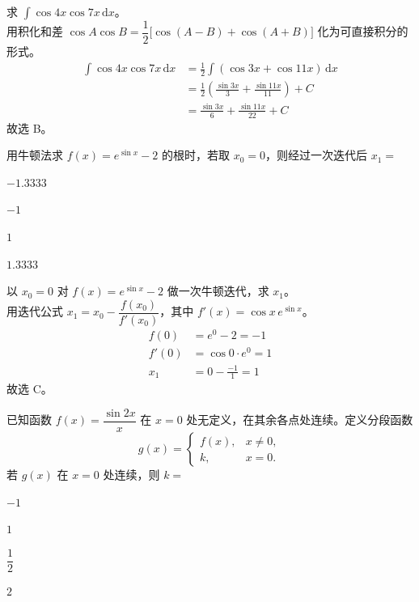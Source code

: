 \begin{solution}
    求 $\displaystyle\int\cos 4x\cos 7x\,\mathrm{d}x$。\\
    用积化和差 $\cos A\cos B=\dfrac12\bigl[\cos(A-B)+\cos(A+B)\bigr]$ 化为可直接积分的形式。\\
    \begin{align*}
        \int\cos 4x\cos 7x\,\mathrm{d}x
        &=\frac12\int(\cos3x+\cos11x)\,\mathrm{d}x \\
        &=\frac12\left(\frac{\sin3x}{3}+\frac{\sin11x}{11}\right)+C \\
        &=\frac{\sin3x}{6}+\frac{\sin11x}{22}+C
    \end{align*}
    故选 B。
\end{solution}

\begin{question}
    用牛顿法求 $f(x)=e^{\sin x}-2$ 的根时，若取 $x_0=0$，则经过一次迭代后 $x_1=$ \paren[C]
    \begin{choices}
        \item $-1.3333$
        \item $-1$
        \item $1$
        \item $1.3333$
    \end{choices}
\end{question}

\begin{solution}
    以 $x_0=0$ 对 $f(x)=e^{\sin x}-2$ 做一次牛顿迭代，求 $x_1$。\\
    用迭代公式 $x_1=x_0-\dfrac{f(x_0)}{f'(x_0)}$，其中 $f'(x)=\cos x\,e^{\sin x}$。\\
    \begin{align*}
        f(0) &=e^0-2=-1 \\
        f'(0) &=\cos 0\cdot e^0=1 \\
        x_1 &=0-\frac{-1}{1}=1
    \end{align*}
    故选 C。
\end{solution}

\begin{question}
    已知函数 $f(x)=\dfrac{\sin 2x}{x}$ 在 $x=0$ 处无定义，在其余各点处连续。定义分段函数
    \[
        g(x)=\begin{cases}
            f(x), & x\neq 0, \\
            k, & x=0.
        \end{cases}
    \]
    若 $g(x)$ 在 $x=0$ 处连续，则 $k=$ \paren[D]
    \begin{choices}
        \item $-1$
        \item $1$
        \item $\dfrac{1}{2}$
        \item $2$
    \end{choices}
\end{question}

